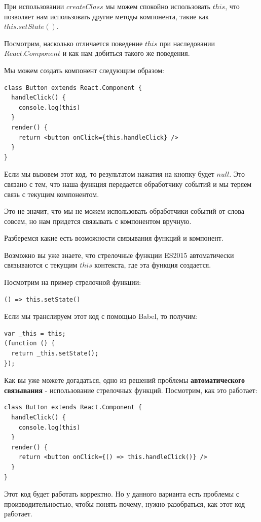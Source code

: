 При использовании $createClass$ мы можем спокойно использовать $this$, что позволяет нам использовать другие методы компонента, такие как $this.setState()$. 

Посмотрим, насколько отличается поведение $this$ при наследовании $React.Component$ и как нам добиться такого же поведения. 

Мы можем создать компонент следующим образом:

\begin{lstlisting}
class Button extends React.Component {
  handleClick() {
    console.log(this)
  }
  render() {
    return <button onClick={this.handleClick} />
  } 
}
\end{lstlisting}

Если мы вызовем этот код, то результатом нажатия на кнопку будет $null$. Это связано с тем, что наша функция передается обработчику событий и мы теряем связь с текущим компонентом.

Это не значит, что мы не можем использовать обработчики событий от слова совсем, но нам придется связывать с компонентом вручную.

Разберемся какие есть возможности связывания функций и компонент.

Возможно вы уже знаете, что стрелочные функции ES2015 автоматически связываются с текущим $this$ контекста, где эта функция создается.

Посмотрим на пример стрелочной функции:

\begin{lstlisting}
() => this.setState()
\end{lstlisting}

Если мы транслируем этот код с помощью Babel, то получим:

\begin{lstlisting}
var _this = this;
(function () {
  return _this.setState();
});
\end{lstlisting}

Как вы уже можете догадаться, одно из решений проблемы \textbf{автоматического связывания} - использование стрелочных функций. Посмотрим, как это работает:

\begin{lstlisting}
class Button extends React.Component {
  handleClick() {
    console.log(this)
  }
  render() {
    return <button onClick={() => this.handleClick()} />
  } 
}
\end{lstlisting}

Этот код будет работать корректно. Но у данного варианта есть проблемы с производительностью, чтобы понять почему, нужно разобраться, как этот код работает.


